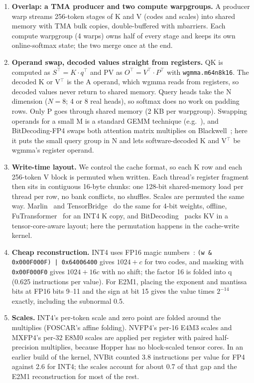\documentclass[11pt]{article}
\begin{document}
\begin{enumerate}
  \item \textbf{Overlap: a TMA producer and two compute warpgroups.} A producer warp streams 256-token stages of K and V (codes and scales) into shared memory with TMA bulk copies, double-buffered with mbarriers. Each compute warpgroup (4 warps) owns half of every stage and keeps its own online-softmax state; the two merge once at the end.
  \item \textbf{Operand swap, decoded values straight from registers.} QK is computed as $S^{\top} = K \cdot q^{\top}$ and PV as $O^{\top} = V^{\top} \cdot P^{\top}$ with \texttt{wgmma.m64n8k16}. The decoded K or V$^{\top}$ is the A operand, which wgmma reads from registers, so decoded values never return to shared memory. Query heads take the N dimension ($N = 8$; 4 or 8 real heads), so softmax does no work on padding rows. Only P goes through shared memory (2 KB per warpgroup). Swapping operands for a small M is a standard GEMM technique (e.g.~\cite{vllm20396,zou2026tensorbridge}), and BitDecoding-FP4 swaps both attention matrix multiplies on Blackwell~\cite{du2026bitdecodingfp4}; here it puts the small query group in N and lets software-decoded K and V$^{\top}$ be wgmma's register operand.
  \item \textbf{Write-time layout.} We control the cache format, so each K row and each 256-token V block is permuted when written. Each thread's register fragment then sits in contiguous 16-byte chunks: one 128-bit shared-memory load per thread per row, no bank conflicts, no shuffles. Scales are permuted the same way. Marlin~\cite{frantar2024marlin} and TensorBridge~\cite{zou2026tensorbridge} do the same for 4-bit weights, offline, FuTransformer~\cite{wang2026futransformer} for an INT4 K copy, and BitDecoding~\cite{du2025bitdecoding} packs KV in a tensor-core-aware layout; here the permutation happens in the cache-write kernel.
  \item \textbf{Cheap reconstruction.} INT4 uses FP16 magic numbers~\cite{kim2022elephants}: \texttt{(w \& 0x000F000F)}\allowbreak\ \texttt{| 0x64006400} gives $1024 + c$ for two codes, and masking with \texttt{0x00F000F0} gives $1024 + 16c$ with no shift; the factor 16 is folded into q (0.625 instructions per value). For E2M1, placing the exponent and mantissa bits at FP16 bits 9--11 and the sign at bit 15 gives the value times $2^{-14}$ exactly, including the subnormal 0.5.
  \item \textbf{Scales.} INT4's per-token scale and zero point are folded around the multiplies (FOSCAR's affine folding). NVFP4's per-16 E4M3 scales and MXFP4's per-32 E8M0 scales are applied per register with paired half-precision multiplies, because Hopper has no block-scaled tensor cores. In an earlier build of the kernel, NVBit counted 3.8 instructions per value for FP4 against 2.6 for INT4; the scales account for about 0.7 of that gap and the E2M1 reconstruction for most of the rest.
\end{enumerate}
\end{document}
